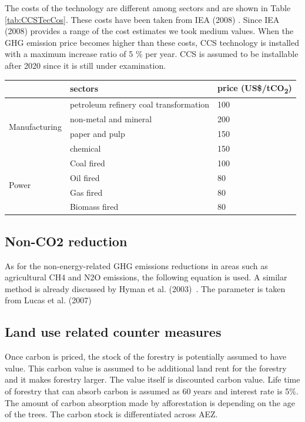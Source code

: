 \documentclass[10pt,a4paper,titlepage,dvipdfmx]{book}
\begin{document}
\begin{itemize}
The costs of the technology are different among sectors and are shown in Table \ref{tab:CCSTecCos}. These costs have been taken from IEA (2008) \cite{RN2115}. Since IEA (2008)\cite{RN2115} provides a range of the cost estimates we took medium values. When the GHG emission price becomes higher than these costs, CCS technology is installed with a maximum increase ratio of 5 \% per year. CCS is assumed to be installable after 2020 since it is still under examination.


\begin{tabularx}{\textwidth}{|
p{}|
p{}|
p{}|} 
\caption{\label{tab:CCSTecCos}CCS technology cost}\\
\hline 
 & sectors & price (US\$/tCO\textsubscript{2}) \\\hline 
\multirow{4}{=}{Manufacturing}  & petroleum refinery coal transformation & 100 \\\cline{2-3}
 & non-metal and mineral & 200 \\\cline{2-3}
 & paper and pulp & 150 \\\cline{2-3}
 & chemical & 150 \\\hline 
\multirow{4}{=}{Power}  & Coal fired & 100 \\\cline{2-3}
 & Oil fired & 80 \\\cline{2-3}
 & Gas fired  & 80 \\\cline{2-3}
 & Biomass fired & 80 \\\hline 
\end{tabularx}

\subsection{\label{subsec:NonCO2Red}{Non-CO2 reduction}}

As for the non-energy-related GHG emissions reductions in areas such as agricultural CH4 and N2O emissions, the following equation is used. A similar method is already discussed by Hyman et al. (2003)~\cite{RN2134}. The parameter is taken from Lucas et al. (2007)~\cite{RN2282}

\subsection{\label{subsec:LanUseRelCouMea}Land use related counter measures}

Once carbon is priced, the stock of the forestry is potentially assumed to have value. This carbon value is assumed to be additional land rent for the forestry and it makes forestry larger. The value itself is discounted carbon value. Life time of forestry that can absorb carbon is assumed as 60 years and interest rate is 5\%. The amount of carbon absorption made by afforestation is depending on the age of the trees. The carbon stock is differentiated across AEZ.


\end{itemize}
\end{document}
